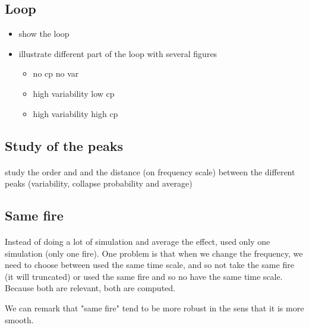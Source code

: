 \documentclass{article}
\begin{document}
\subsection{Loop}

\begin{itemize}
    \item show the loop
    \item illustrate different part of the loop with several figures
    \begin{itemize}
        \item no cp no var
        \item high variability low cp
        \item high variability high cp
    \end{itemize}
\end{itemize}

\subsection{Study of the peaks}

\paragraph{}
study the order and and the distance (on frequency scale) between the different peaks (variability, collapse probability and average)


\subsection{Same fire}

\paragraph{}
Instead of doing a lot of simulation and average the effect, used only one simulation (only one fire). One problem is that when we change the frequency, we need to choose between used the same time scale, and so not take the same fire (it will truncated) or used the same fire and so no have the same time scale. Because both are relevant, both are computed. 

We can remark that "same fire" tend to be more robust in the sens that it is more smooth.


\newpage
\end{document}
